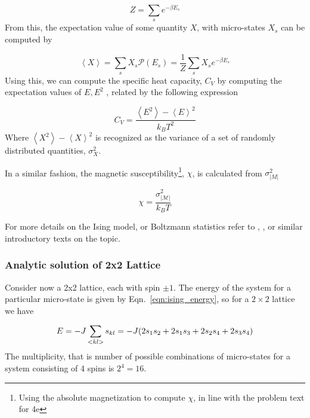 \documentclass[10pt,showpacs,preprintnumbers,amsmath,amssymb,nofootinbib,aps,prl,twocolumn,groupedaddress,superscriptaddress,showkeys]{revtex4-1}
\begin{document}
      \begin{equation}
        Z = \sum_s e^{-\beta E_s}
      \end{equation}
      From this, the expectation value of some quantity $X$, with micro-states $X_s$ can be computed by

      \begin{equation}
        \left<X\right> = \sum_s X_s \mathcal P(E_s) = \frac{1}{Z} \sum_s X_s e^{-\beta E_s} 
        \label{eqn:expecval}
      \end{equation}
      Using this, we can compute the specific heat capacity, $C_V$ by computing the expectation values of $E, E^2$ \cite{statmek_lecnotes}, related by the following expression

      \begin{equation}
        C_V = \frac{\left<E^2\right> - \left<E\right>^2}{k_B T^2}
        \label{eqn:speciffic heat}
      \end{equation}
      Where $\left<X^2\right> - \left<X\right>^2$ is recognized as the variance of a set of randomly distributed quantities, $\sigma_X^2$.

      In a similar fashion, the magnetic susceptibility\footnote{Using the absolute magnetization to compute $\chi$, in line with the problem text for 4e}, $\chi$, is calculated from $\sigma_{\mathcal |M|} ^2$ \cite{statmek_lecnotes}

      \begin{equation}
        \chi = \frac{\sigma^2_\mathcal{|M|}}{k_B T}
        \label{eqn:suceptibility}
      \end{equation}

      For more details on the Ising model, or Boltzmann statistics refer to \textcite[Ch~6, 8.2]{schroeder}, \textcite{statmek_lecnotes}, or similar introductory texts on the topic.

  \subsubsection{Analytic solution of 2x2 Lattice}
    Consider now a 2x2 lattice, each with spin $\pm 1$.
    The energy of the system for a particular micro-state is given by Eqn.~\ref{eqn:ising_energy}, so for a $2\times2$ lattice we have

    \begin{equation}
      E = -J\sum_{<kl>}s_{kl} = -J\qty( 2s_1s_2 + 2s_1s_3 + 2s_2s_4 + 2s_3s_4)
    \end{equation}
    The multiplicity, that is number of possible combinations of micro-states for a system consisting of 4 spins is $2^4=16$.
\end{document}
